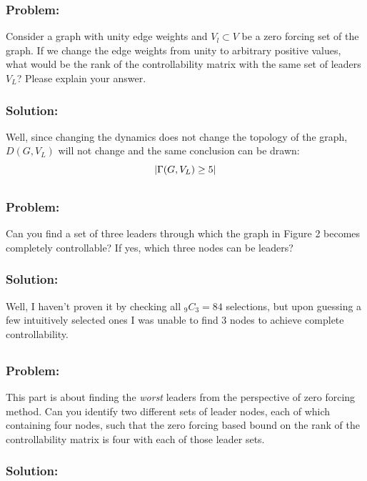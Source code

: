 \documentclass[]{article}
\numberwithin{equation}{section}
\begin{document}
\subsubsection*{Problem:}
Consider a graph with unity edge weights and $V_l \subset V$ be a zero forcing set of the graph. 
If we change the edge weights from unity to arbitrary positive values, what would be the rank of the controllability matrix with the same set of leaders $V_L$? 
Please explain your answer.
\subsubsection*{Solution:}
Well, since changing the dynamics does not change the topology of the graph, $D(G,V_L)$ will not change and the same conclusion can be drawn: \[
    \abs{\Gamma(G,V_L) \geq 5}
\]

\subsection{}
\subsubsection*{Problem:}
Can you find a set of three leaders through which the graph in Figure 2 becomes completely controllable? 
If yes, which three nodes can be leaders?
\subsubsection*{Solution:}
Well, I haven't proven it by checking all $_9 C_3 = 84$ selections, but upon guessing a few intuitively selected ones I was unable to find 3 nodes to achieve complete controllability.

\subsection{}
\subsubsection*{Problem:}
This part is about finding the \emph{worst} leaders from the perspective of zero forcing method. 
Can you identify two different sets of leader nodes, each of which containing four nodes, such that the zero forcing based bound on the rank of the controllability matrix is four with each of those leader sets. 
\subsubsection*{Solution:}
\end{document}
